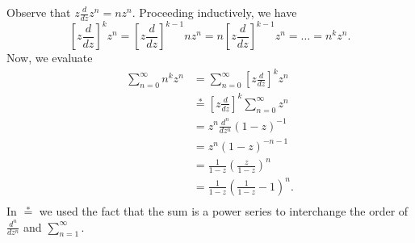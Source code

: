 \documentclass{homework}
\begin{document}
\begin{solution}
Observe that $ z\frac d{dz} z^n = nz^n.  $
Proceeding inductively, we have 
$$
  \left[z\frac d{dz}\right]^k z^n = \left[ z\frac d{dz} \right]^{k-1} nz^n = n \left[ z\frac d{dz} \right]^{k-1} z^n = \dots =n^k z^n.
$$
Now, we evaluate
\begin{align*}
  \sum_{n=0}^\infty n^k z^n 
  &= \sum_{n=0}^\infty \left[z\frac d{dz}\right]^k z^n \\
  &\stackrel*=  \left[z\frac d{dz}\right]^k \sum_{n=0}^\infty z^n \\
  &= z^n \frac{d^n}{dz^n} (1-z)^{-1}\\
  &= z^n (1-z)^{-n-1}\\
  &= \frac 1{1-z} \left(\frac z{1-z}\right)^{n}\\
  &= \frac 1{1-z} \left(\frac 1{1-z}- 1\right)^{n}.\\
\end{align*}
In $\stackrel*=$ we used the fact that the sum is a power series to interchange
the order of $\frac {d^n}{dz^n}$ and $\sum_{n=1}^\infty$.
%
\end{solution}
\end{document}
